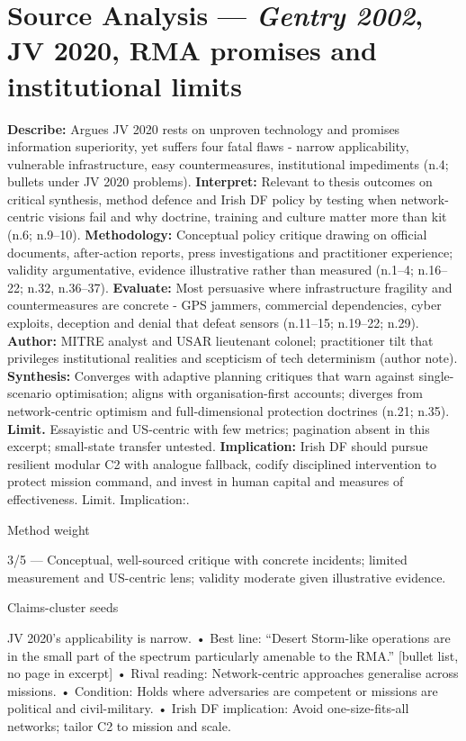 \section*{Source Analysis — \textit{Gentry 2002}, JV 2020, RMA promises and institutional limits}
\textbf{Describe:} Argues JV 2020 rests on unproven technology and promises information superiority, yet suffers four fatal flaws - narrow applicability, vulnerable infrastructure, easy countermeasures, institutional impediments (n.4; bullets under JV 2020 problems).
\textbf{Interpret:} Relevant to thesis outcomes on critical synthesis, method defence and Irish DF policy by testing when network-centric visions fail and why doctrine, training and culture matter more than kit (n.6; n.9–10).
\textbf{Methodology:} Conceptual policy critique drawing on official documents, after-action reports, press investigations and practitioner experience; validity argumentative, evidence illustrative rather than measured (n.1–4; n.16–22; n.32, n.36–37).
\textbf{Evaluate:} Most persuasive where infrastructure fragility and countermeasures are concrete - GPS jammers, commercial dependencies, cyber exploits, deception and denial that defeat sensors (n.11–15; n.19–22; n.29).
\textbf{Author:} MITRE analyst and USAR lieutenant colonel; practitioner tilt that privileges institutional realities and scepticism of tech determinism (author note).
\textbf{Synthesis:} Converges with adaptive planning critiques that warn against single-scenario optimisation; aligns with organisation-first accounts; diverges from network-centric optimism and full-dimensional protection doctrines (n.21; n.35).
\textbf{Limit.} Essayistic and US-centric with few metrics; pagination absent in this excerpt; small-state transfer untested.
\textbf{Implication:} Irish DF should pursue resilient modular C2 with analogue fallback, codify disciplined intervention to protect mission command, and invest in human capital and measures of effectiveness. Limit. Implication:.

Method weight

3/5 — Conceptual, well-sourced critique with concrete incidents; limited measurement and US-centric lens; validity moderate given illustrative evidence.

Claims-cluster seeds

JV 2020’s applicability is narrow.
• Best line: “Desert Storm-like operations are in the small part of the spectrum particularly amenable to the RMA.” [bullet list, no page in excerpt]
• Rival reading: Network-centric approaches generalise across missions.
• Condition: Holds where adversaries are competent or missions are political and civil-military.
• Irish DF implication: Avoid one-size-fits-all networks; tailor C2 to mission and scale.

